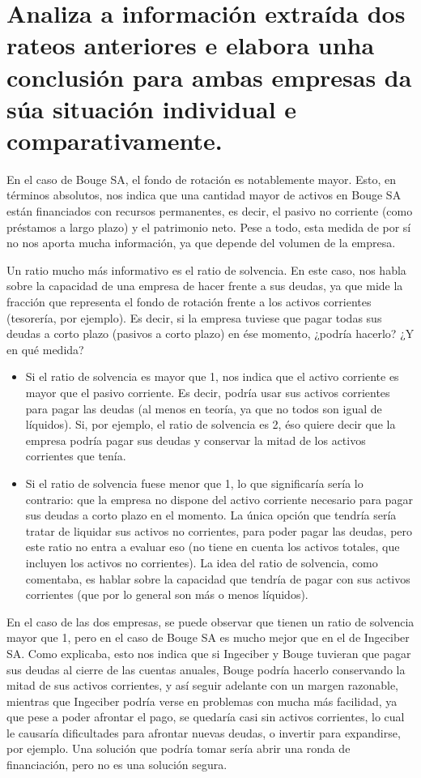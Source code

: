 \documentclass[a4paper]{article}
\begin{document}
\section{Analiza a información extraída dos rateos anteriores e elabora unha conclusión para ambas empresas da súa situación individual e comparativamente.}

En el caso de Bouge SA, el fondo de rotación es notablemente mayor. Esto, en términos absolutos, nos indica que una cantidad mayor de activos en Bouge SA están financiados con recursos permanentes, es decir, el pasivo no corriente (como préstamos a largo plazo) y el patrimonio neto. Pese a todo, esta medida de por sí no nos aporta mucha información, ya que depende del volumen de la empresa.

Un ratio mucho más informativo es el ratio de solvencia. En este caso, nos habla sobre la capacidad de una empresa de hacer frente a sus deudas, ya que mide la fracción que representa el fondo de rotación frente a los activos corrientes (tesorería, por ejemplo). Es decir, si la empresa tuviese que pagar todas sus deudas a corto plazo (pasivos a corto plazo) en ése momento, ¿podría hacerlo? ¿Y en qué medida?

\begin{itemize}
    \item Si el ratio de solvencia es mayor que 1, nos indica que el activo corriente es mayor que el pasivo corriente. Es decir, podría usar sus activos corrientes para pagar las deudas (al menos en teoría, ya que no todos son igual de líquidos). Si, por ejemplo, el ratio de solvencia es 2, éso quiere decir que la empresa podría pagar sus deudas y conservar la mitad de los activos corrientes que tenía.
    \item Si el ratio de solvencia fuese menor que 1, lo que significaría sería lo contrario: que la empresa no dispone del activo corriente necesario para pagar sus deudas a corto plazo en el momento. La única opción que tendría sería tratar de liquidar sus activos no corrientes, para poder pagar las deudas, pero este ratio no entra a evaluar eso (no tiene en cuenta los activos totales, que incluyen los activos no corrientes). La idea del ratio de solvencia, como comentaba, es hablar sobre la capacidad que tendría de pagar con sus activos corrientes (que por lo general son más o menos líquidos).
\end{itemize}

En el caso de las dos empresas, se puede observar que tienen un ratio de solvencia mayor que 1, pero en el caso de Bouge SA es mucho mejor que en el de Ingeciber SA. Como explicaba, esto nos indica que si Ingeciber y Bouge tuvieran que pagar sus deudas al cierre de las cuentas anuales, Bouge podría hacerlo conservando la mitad de sus activos corrientes, y así seguir adelante con un margen razonable, mientras que Ingeciber podría verse en problemas con mucha más facilidad, ya que pese a poder afrontar el pago, se quedaría casi sin activos corrientes, lo cual le causaría dificultades para afrontar nuevas deudas, o invertir para expandirse, por ejemplo. Una solución que podría tomar sería abrir una ronda de financiación, pero no es una solución segura.
\end{document}
